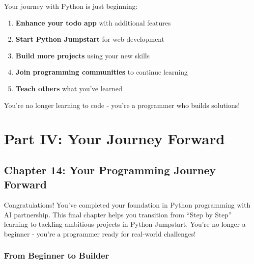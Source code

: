 \documentclass[
  letterpaper,
  DIV=11,
  numbers=noendperiod,
  oneside]{scrreprt}
\providecommand{\tightlist}{%
  \setlength{\itemsep}{0pt}\setlength{\parskip}{0pt}}\usepackage{longtable,booktabs,array}
\begin{document}
Your journey with Python is just beginning:

\begin{enumerate}
\def\labelenumi{\arabic{enumi}.}
\tightlist
\item
  \textbf{Enhance your todo app} with additional features
\item
  \textbf{Start Python Jumpstart} for web development
\item
  \textbf{Build more projects} using your new skills
\item
  \textbf{Join programming communities} to continue learning
\item
  \textbf{Teach others} what you've learned
\end{enumerate}

You're no longer learning to code - you're a programmer who builds
solutions! 🚀

\part{Part IV: Your Journey Forward}

\chapter{Chapter 14: Your Programming Journey
Forward}\label{sec-next-steps}

\begin{tcolorbox}[enhanced jigsaw, opacityback=0, colback=white, colframe=quarto-callout-note-color-frame, breakable, titlerule=0mm, coltitle=black, rightrule=.15mm, colbacktitle=quarto-callout-note-color!10!white, left=2mm, bottomtitle=1mm, bottomrule=.15mm, title=\textcolor{quarto-callout-note-color}{\faInfo}\hspace{0.5em}{Chapter Summary}, opacitybacktitle=0.6, toptitle=1mm, leftrule=.75mm, arc=.35mm, toprule=.15mm]

Congratulations! You've completed your foundation in Python programming
with AI partnership. This final chapter helps you transition from ``Step
by Step'' learning to tackling ambitious projects in Python Jumpstart.
You're no longer a beginner - you're a programmer ready for real-world
challenges!

\end{tcolorbox}

\section{From Beginner to Builder}\label{from-beginner-to-builder}
\end{document}
